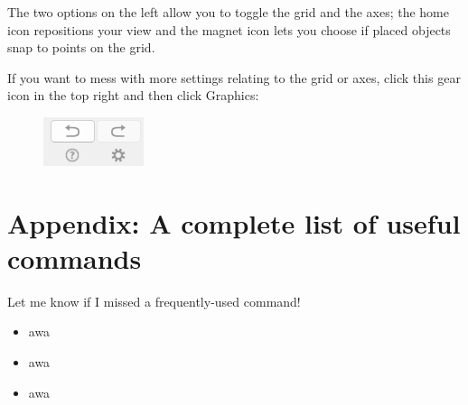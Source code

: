 \documentclass{scrartcl}
\providecommand{\ii}{\item}
\begin{document}
The two options on the left allow you to toggle the grid and the axes;
the home icon repositions your view and the magnet icon
lets you choose if placed objects snap to points on the grid.

If you want to mess with more settings relating to the grid or axes,
click this gear icon in the top right and then click Graphics:
\begin{figure}[h]
	\centering
	\includegraphics[width=0.2\linewidth]{moreSettings}
	\label{fig:moresettings}
\end{figure}

\section{Appendix: A complete list of useful commands}
Let me know if I missed a frequently-used command!

\begin{itemize}
	\ii awa
	\ii awa
	\ii awa
\end{itemize}
\end{document}
